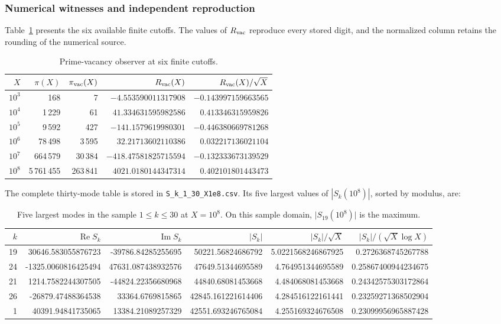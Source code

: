 \subsubsection{Numerical witnesses and independent reproduction}

Table~\ref{tab:f051-rvac-powers} presents the six available finite
cutoffs. The values of \(R_{\rm vac}\) reproduce every stored digit, and
the normalized column retains the rounding of the numerical source.

\begin{table}[htbp]
\centering
\small
\begin{tabular}{rrrrr}
\toprule
\(X\) & \(\pi(X)\) & \(\pi_{\rm vac}(X)\) & \(R_{\rm vac}(X)\)
 & \(R_{\rm vac}(X)/\sqrt X\)\\
\midrule
\(10^3\) & 168 & 7 & \(-4.553590011317908\) & \(-0.143997159663565\)\\
\(10^4\) & 1\,229 & 61 & \(41.334631595982586\) & \(0.413346315959826\)\\
\(10^5\) & 9\,592 & 427 & \(-141.1579619980301\) & \(-0.446380669781268\)\\
\(10^6\) & 78\,498 & 3\,595 & \(32.21713602110386\) & \(0.032217136021104\)\\
\(10^7\) & 664\,579 & 30\,384 & \(-418.47581825715594\) & \(-0.132333673139529\)\\
\(10^8\) & 5\,761\,455 & 263\,841 & \(4021.0180144347314\) & \(0.402101801443473\)\\
\bottomrule
\end{tabular}
\caption{Prime-vacancy observer at six finite cutoffs.}
\label{tab:f051-rvac-powers}
\end{table}

The complete thirty-mode table is stored in
\texttt{S\_k\_1\_30\_X1e8.csv}. Its five largest values of
\(|S_k(10^8)|\), sorted by modulus, are:

\begin{table}[htbp]
\centering
\scriptsize
\setlength{\tabcolsep}{3.5pt}
\begin{tabular}{rrrrrr}
\toprule
\(k\) & \(\operatorname{Re}S_k\) & \(\operatorname{Im}S_k\)
 & \(|S_k|\) & \(|S_k|/\sqrt X\) & \(|S_k|/(\sqrt X\log X)\)\\
\midrule
19 & 30646.583055876723 & -39786.84285255695 & 50221.56824686792 & 5.0221568246867925 & 0.2726368745267788\\
24 & -1325.0060816425494 & 47631.087438932576 & 47649.51344695589 & 4.764951344695589 & 0.25867400944234675\\
21 & 1214.7582244307505 & -44824.22356680968 & 44840.68081453668 & 4.484068081453668 & 0.24342575303172864\\
26 & -26879.47488364538 & 33364.6769815865 & 42845.161221614406 & 4.284516122161441 & 0.23259271368502904\\
1 & 40391.94841735065 & 13384.21089257329 & 42551.693246765084 & 4.255169324676508 & 0.23099956965887428\\
\bottomrule
\end{tabular}
\caption{Five largest modes in the sample \(1\leq k\leq30\) at
\(X=10^8\). On this sample domain,
\(\lvert S_{19}(10^8)\rvert\) is the maximum.}
\label{tab:f051-top-five-modes}
\end{table}

